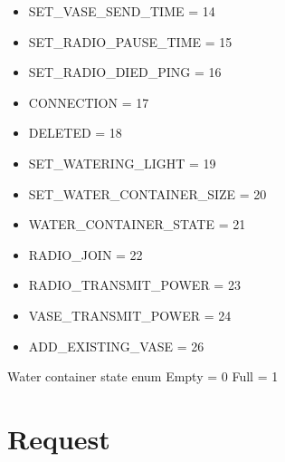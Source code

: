 \documentclass[letterpaper,10pt,english]{sphinxmanual}
\begin{document}
\begin{fulllineitems}
\begin{itemize}
\item {} 
SET\_VASE\_SEND\_TIME = 14

\item {} 
SET\_RADIO\_PAUSE\_TIME = 15

\item {} 
SET\_RADIO\_DIED\_PING = 16

\item {} 
CONNECTION = 17

\item {} 
DELETED = 18

\item {} 
SET\_WATERING\_LIGHT = 19

\item {} 
SET\_WATER\_CONTAINER\_SIZE = 20

\item {} 
WATER\_CONTAINER\_STATE = 21

\item {} 
RADIO\_JOIN = 22

\item {} 
RADIO\_TRANSMIT\_POWER = 23

\item {} 
VASE\_TRANSMIT\_POWER = 24

\item {} 
ADD\_EXISTING\_VASE = 26

\end{itemize}

\end{fulllineitems}


\begin{fulllineitems}
\label{\detokenize{index:constants.WaterContainerState}}
Water container state enum
\sphinxhyphen{} Empty = 0
\sphinxhyphen{} Full = 1

\end{fulllineitems}



\chapter{Request}
\label{\detokenize{index:module-request}}\label{\detokenize{index:request}}
\end{document}
